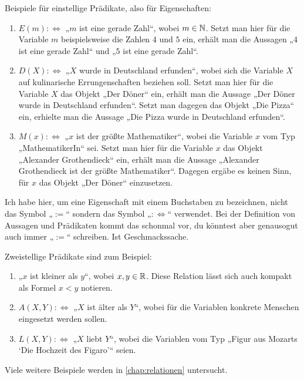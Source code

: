 \begin{bsp}
    Beispiele für einstellige Prädikate, also für Eigenschaften:
    \begin{enumerate}
        \item $E(m):\Leftrightarrow$ „$m$ ist eine gerade Zahl“, wobei $m\in \mathbb N$. Setzt man hier für die Variable $m$ beispielsweise die Zahlen $4$ und $5$ ein, erhält man die Aussagen „$4$ ist eine gerade Zahl“ und „$5$ ist eine gerade Zahl“.
        \item $D(X):\Leftrightarrow$ „$X$ wurde in Deutschland erfunden“, wobei sich die Variable $X$ auf kulinarische Errungenschaften beziehen soll. Setzt man hier für die Variable $X$ das Objekt „Der Döner“ ein, erhält man die Aussage „Der Döner wurde in Deutschland erfunden“. Setzt man dagegen das Objekt „Die Pizza“ ein, erhielte man die Aussage „Die Pizza wurde in Deutschland erfunden“.
        \item $M(x):\Leftrightarrow $ „$x$ ist der größte Mathematiker“, wobei die Variable $x$ vom Typ „MathematikerIn“ sei. Setzt man hier für die Variable $x$ das Objekt „Alexander Grothendieck“ ein, erhält man die Aussage „Alexander Grothendieck ist der größte Mathematiker“. Dagegen ergäbe es keinen Sinn, für $x$ das Objekt „Der Döner“ einzusetzen.
    \end{enumerate}
    Ich habe hier, um eine Eigenschaft mit einem Buchstaben zu bezeichnen, nicht das Symbol „$:=$“ sondern das Symbol „$:\Leftrightarrow$“ verwendet. Bei der Definition von Aussagen und Prädikaten kommt das schonmal vor, du könntest aber genausogut auch immer „$:=$“ schreiben. Ist Geschmackssache.
\end{bsp}


\begin{bsp}
    Zweistellige Prädikate sind zum Beispiel:
    \begin{enumerate}
        \item „$x$ ist kleiner als $y$“, wobei $x,y\in \mathbb R$. Diese Relation lässt sich auch kompakt als Formel $x<y$ notieren.
        \item $A(X,Y):\Leftrightarrow$ „$X$ ist älter als $Y$“, wobei für die Variablen konkrete Menschen eingesetzt werden sollen.
        \item $L(X,Y):\Leftrightarrow$ „$X$ liebt $Y$“, wobei die Variablen vom Typ „Figur aus Mozarts `Die Hochzeit des Figaro'“ seien.
    \end{enumerate}
    Viele weitere Beispiele werden in \cref{chap:relationen} untersucht.
\end{bsp}


